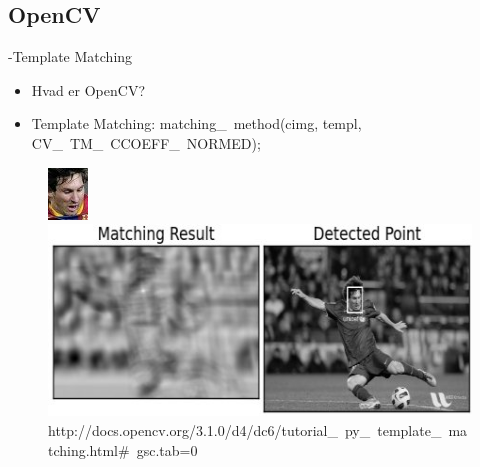 \subsection{OpenCV}
\begin{frame}[fragile]{\insertsection}
  \tableofcontents[currentsubsection]
\end{frame}

\begin{frame}[fragile]{\insertsection}{\insertsubsection -Template Matching}
	\begin{itemize}
		\item Hvad er OpenCV?
			\item Template Matching: matching\_\ method(cimg, templ, CV\_\ TM\_\ CCOEFF\_\ NORMED);
	\end{itemize}
	\begin{figure}
		\begin{minipage}{0.20\textwidth}
			\includegraphics[scale=1]{pictures/messi_face.jpg}
		\end{minipage}
		\begin{minipage}{0.75\textwidth}
			\includegraphics[width=\textwidth]{pictures/template_ccorrn_4.jpg}				
		\end{minipage}
		\caption{http://docs.opencv.org/3.1.0/d4/dc6/tutorial\_\ py\_\ template\_\ matching.html\#\ gsc.tab=0}
	\end{figure}
\end{frame}

